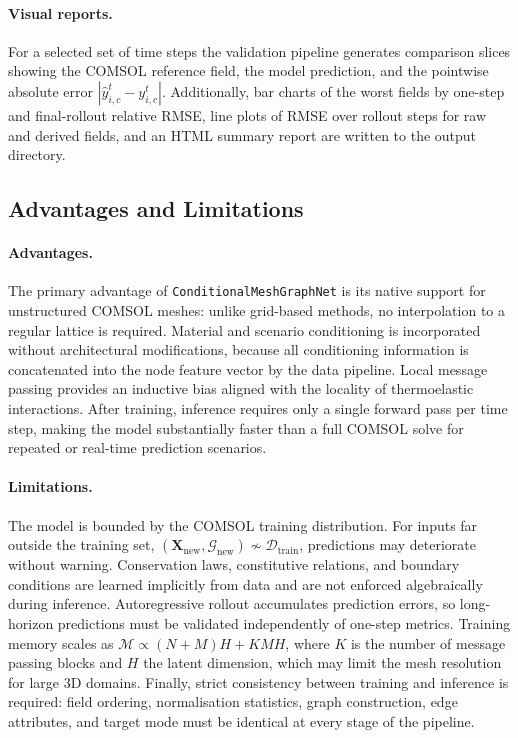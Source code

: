 \paragraph{Visual reports.}
For a selected set of time steps the validation pipeline generates comparison
slices showing the COMSOL reference field, the model prediction, and the
pointwise absolute error \(|\hat{y}_{i,c}^t - y_{i,c}^t|\).
Additionally, bar charts of the worst fields by one-step and final-rollout
relative RMSE, line plots of RMSE over rollout steps for raw and derived
fields, and an HTML summary report are written to the output directory.

\subsection{Advantages and Limitations}

\paragraph{Advantages.}
The primary advantage of \texttt{ConditionalMeshGraphNet} is its native
support for unstructured COMSOL meshes: unlike grid-based methods, no
interpolation to a regular lattice is required.
Material and scenario conditioning is incorporated without architectural
modifications, because all conditioning information is concatenated into the
node feature vector by the data pipeline.
Local message passing provides an inductive bias aligned with
the locality of thermoelastic interactions.
After training, inference requires only a single forward pass per time step,
making the model substantially faster than a full COMSOL solve for
repeated or real-time prediction scenarios.

\paragraph{Limitations.}
The model is bounded by the COMSOL training distribution.
For inputs far outside the training set,
\((\mathbf{X}_{\mathrm{new}},\mathcal{G}_{\mathrm{new}})\not\sim\mathcal{D}_{\mathrm{train}}\),
predictions may deteriorate without warning.
Conservation laws, constitutive relations, and boundary conditions are learned
implicitly from data and are not enforced algebraically during inference.
Autoregressive rollout accumulates prediction errors, so long-horizon
predictions must be validated independently of one-step metrics.
Training memory scales as
\(\mathcal{M} \propto (N+M)H + KMH\),
where \(K\) is the number of message passing blocks and \(H\) the latent
dimension, which may limit the mesh resolution for large 3D domains.
Finally, strict consistency between training and inference is required:
field ordering, normalisation statistics, graph construction, edge attributes,
and target mode must be identical at every stage of the pipeline.

